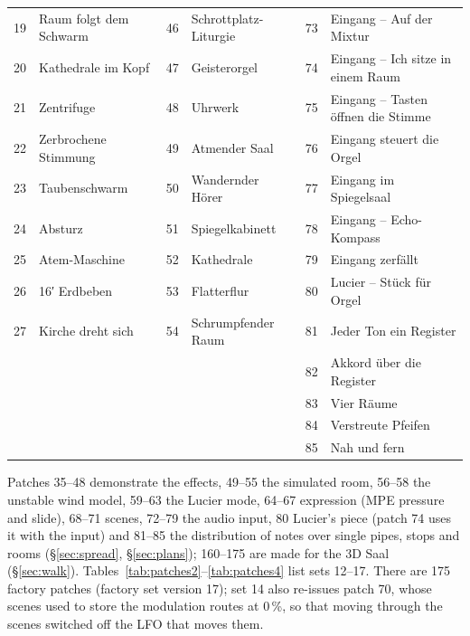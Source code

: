 \documentclass[11pt,a4paper,parskip=half,DIV=11,toc=bibliography]{scrartcl}
\begin{document}
\begin{center}
{\begin{tabular}{@{}rl@{\hspace{1.5em}}rl@{\hspace{1.5em}}rl@{}}
19 & Raum folgt dem Schwarm & 46 & Schrottplatz-Liturgie & 73 & Eingang – Auf der Mixtur \\
20 & Kathedrale im Kopf & 47 & Geisterorgel & 74 & Eingang – Ich sitze in einem Raum \\
21 & Zentrifuge & 48 & Uhrwerk & 75 & Eingang – Tasten öffnen die Stimme \\
22 & Zerbrochene Stimmung & 49 & Atmender Saal & 76 & Eingang steuert die Orgel \\
23 & Taubenschwarm & 50 & Wandernder Hörer & 77 & Eingang im Spiegelsaal \\
24 & Absturz & 51 & Spiegelkabinett & 78 & Eingang – Echo-Kompass \\
25 & Atem-Maschine & 52 & Kathedrale & 79 & Eingang zerfällt \\
26 & 16′ Erdbeben & 53 & Flatterflur & 80 & Lucier – Stück für Orgel \\
27 & Kirche dreht sich & 54 & Schrumpfender Raum & 81 & Jeder Ton ein Register \\
 &  &  &  & 82 & Akkord über die Register \\
 &  &  &  & 83 & Vier Räume \\
 &  &  &  & 84 & Verstreute Pfeifen \\
 &  &  &  & 85 & Nah und fern \\
\bottomrule
\end{tabular}}
\end{center}
Patches 35--48 demonstrate the effects, 49--55 the simulated room, 56--58 the unstable wind model, 59--63 the Lucier mode, 64--67 expression (MPE pressure and slide), 68--71 scenes, 72--79 the audio input, 80 Lucier's piece (patch 74 uses it with the input) and 81--85 the distribution of notes over single pipes, stops and rooms (\S\ref{sec:spread}, \S\ref{sec:plans}); 160--175 are made for the 3D Saal (\S\ref{sec:walk}).
Tables~\ref{tab:patches2}--\ref{tab:patches4} list sets 12--17. There are 175 factory patches (factory set version 17); set 14 also re-issues
patch 70, whose scenes used to store the modulation routes at 0\,\%, so that moving through the scenes switched off the
LFO that moves them.
\end{document}
